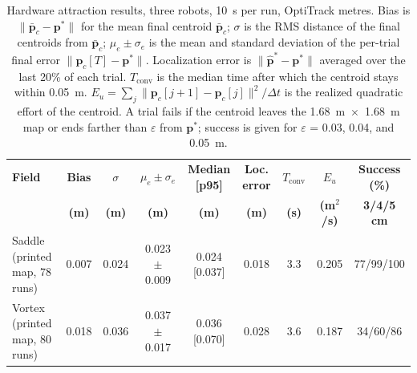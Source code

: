 \begin{table}[!t]
\centering
\footnotesize
\caption{Hardware attraction results, three robots, 10~s per run, OptiTrack metres. Bias is $\|\bar{\mathbf{p}}_c - \mathbf{p}^*\|$ for the mean final centroid $\bar{\mathbf{p}}_c$; $\sigma$ is the RMS distance of the final centroids from $\bar{\mathbf{p}}_c$; $\mu_e \pm \sigma_e$ is the mean and standard deviation of the per-trial final error $\|\mathbf{p}_c[T] - \mathbf{p}^*\|$. Localization error is $\|\hat{\mathbf{p}}^* - \mathbf{p}^*\|$ averaged over the last 20\% of each trial. $T_{\mathrm{conv}}$ is the median time after which the centroid stays within 0.05~m. $E_u = \sum_j \|\mathbf{p}_c[j+1] - \mathbf{p}_c[j]\|^2/\Delta t$ is the realized quadratic effort of the centroid. A trial fails if the centroid leaves the 1.68~m~$\times$~1.68~m map or ends farther than $\varepsilon$ from $\mathbf{p}^*$; success is given for $\varepsilon$ = 0.03, 0.04, and 0.05~m.}
\label{tab:estimation_results}
\setlength{\tabcolsep}{4pt}
\begin{tabular}{lcccccccc}
\hline
\textbf{Field} & \textbf{Bias} & \textbf{$\sigma$} & \textbf{$\mu_e \pm \sigma_e$} & \textbf{Median [p95]} & \textbf{Loc. error} & \textbf{$T_{\mathrm{conv}}$} & \textbf{$E_u$} & \textbf{Success (\%)} \\
 & \textbf{(m)} & \textbf{(m)} & \textbf{(m)} & \textbf{(m)} & \textbf{(m)} & \textbf{(s)} & \textbf{(m$^2$/s)} & \textbf{3/4/5 cm} \\
\hline
Saddle (printed map, 78 runs) & 0.007 & 0.024 & 0.023 $\pm$ 0.009 & 0.024 [0.037] & 0.018 & 3.3 & 0.205 & 77/99/100 \\
Vortex (printed map, 80 runs) & 0.018 & 0.036 & 0.037 $\pm$ 0.017 & 0.036 [0.070] & 0.028 & 3.6 & 0.187 & 34/60/86 \\
\hline
\end{tabular}
\end{table}
